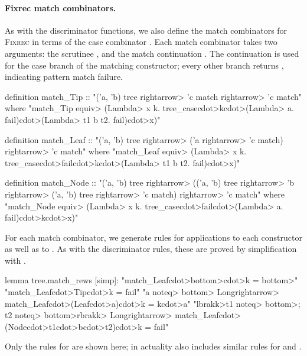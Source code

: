 \paragraph{Fixrec match combinators.}

As with the discriminator functions, we also define the match combinators for \textsc{Fixrec} in terms of the case combinator . Each match combinator takes two arguments: the scrutinee , and the match continuation . The continuation is used for the case branch of the matching constructor; every other branch returns , indicating pattern match failure.

\begin{isacode}
definition match_Tip :: "('a, 'b) tree \<rightarrow> 'c match \<rightarrow> 'c match"
  where "match_Tip \<equiv> (\<Lambda> x k. tree_case\<cdot>k\<cdot>(\<Lambda> a. fail)\<cdot>(\<Lambda> t1 b t2. fail)\<cdot>x)"
\end{isacode}
\unmedskip
{}
\begin{isacode}
definition match_Leaf :: "('a, 'b) tree \<rightarrow> ('a \<rightarrow> 'c match) \<rightarrow> 'c match"
  where "match_Leaf \<equiv> (\<Lambda> x k. tree_case\<cdot>fail\<cdot>k\<cdot>(\<Lambda> t1 b t2. fail)\<cdot>x)"
\end{isacode}
\unmedskip
{}
\begin{isacode}
definition match_Node ::
    "('a, 'b) tree \<rightarrow> (('a, 'b) tree \<rightarrow> 'b \<rightarrow> ('a, 'b) tree \<rightarrow> 'c match) \<rightarrow> 'c match"
  where "match_Node \<equiv> (\<Lambda> x k. tree_case\<cdot>fail\<cdot>(\<Lambda> a. fail)\<cdot>k\<cdot>x)"
\end{isacode}
%
For each match combinator, we generate rules for applications to each constructor as well as to . As with the discriminator rules, these are proved by simplification with .
%
\begin{isacode}
lemma tree.match_rews [simp]:
  "match_Leaf\<cdot>\<bottom>\<cdot>k = \<bottom>"
  "match_Leaf\<cdot>Tip\<cdot>k = fail"
  "a \<noteq> \<bottom> \<Longrightarrow> match_Leaf\<cdot>(Leaf\<cdot>a)\<cdot>k = k\<cdot>a"
  "\<lbrakk>t1 \<noteq> \<bottom>; t2 \<noteq> \<bottom>\<rbrakk> \<Longrightarrow> match_Leaf\<cdot>(Node\<cdot>t1\<cdot>b\<cdot>t2)\<cdot>k = fail"
\end{isacode}
%
Only the rules for  are shown here; in actuality  also includes similar rules for  and .

